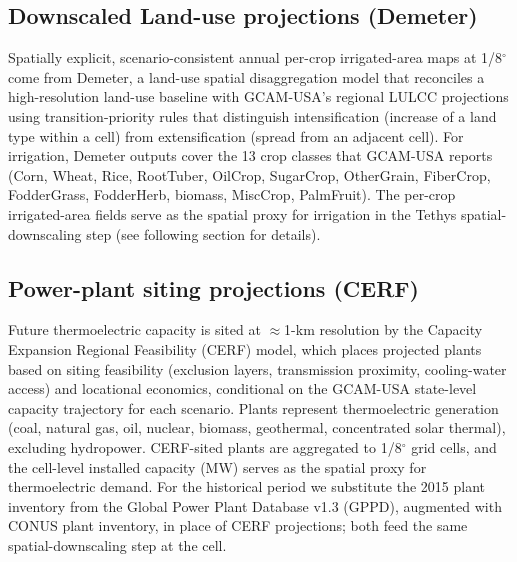 \documentclass[fleqn,10pt]{wlscirep}
\begin{document}
\subsection*{Downscaled Land-use projections (Demeter)}

Spatially explicit, scenario-consistent annual per-crop irrigated-area maps at 1/8$^{\circ}$ come from Demeter\cite{Vernon-2018}, a land-use spatial disaggregation model that reconciles a high-resolution land-use baseline with GCAM-USA's regional LULCC projections using transition-priority rules that distinguish intensification (increase of a land type within a cell) from extensification (spread from an adjacent cell). For irrigation, Demeter outputs cover the 13 crop classes that GCAM-USA reports (Corn, Wheat, Rice, RootTuber, OilCrop, SugarCrop, OtherGrain, FiberCrop, FodderGrass, FodderHerb, biomass, MiscCrop, PalmFruit). The per-crop irrigated-area fields serve as the spatial proxy for irrigation in the Tethys spatial-downscaling step (see following section for details).

\subsection*{Power-plant siting projections (CERF)\label{sec:cerf}}

Future thermoelectric capacity is sited at $\approx$1-km resolution by the Capacity Expansion Regional Feasibility (CERF) model\cite{Vernon2021,Mongird2025CERF}, which places projected plants based on siting feasibility (exclusion layers, transmission proximity, cooling-water access) and locational economics, conditional on the GCAM-USA state-level capacity trajectory for each scenario. Plants represent thermoelectric generation (coal, natural gas, oil, nuclear, biomass, geothermal, concentrated solar thermal), excluding hydropower. CERF-sited plants are aggregated to 1/8$^{\circ}$ grid cells, and the cell-level installed capacity (MW) serves as the spatial proxy for thermoelectric demand. For the historical period we substitute the 2015 plant inventory from the Global Power Plant Database v1.3 (GPPD), 
augmented with CONUS plant inventory, in place of CERF projections; both feed the same spatial-downscaling step at the cell.
\end{document}
